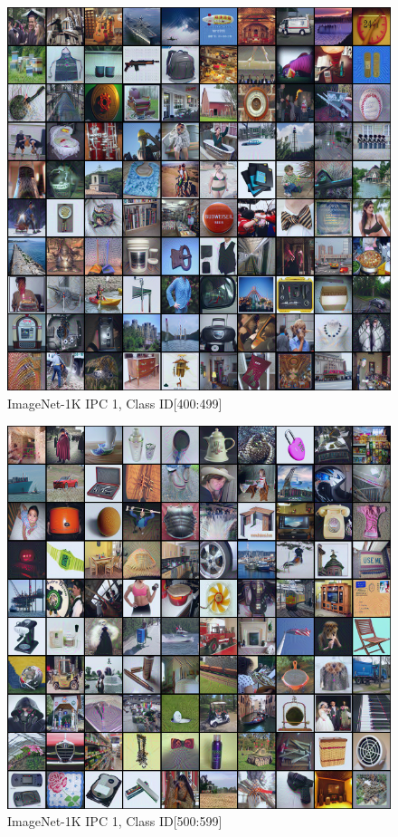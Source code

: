 \documentclass[10pt,twocolumn,letterpaper]{article}
\begin{document}
\begin{figure}
    \centering
    \includegraphics[width=\textwidth]{images/appendix/row-5-column-1.png}
    \caption{ImageNet-1K IPC 1, Class ID[400:499]}
\end{figure}
\begin{figure}
    \centering
    \includegraphics[width=\textwidth]{images/appendix/row-6-column-1.png}
    \caption{ImageNet-1K IPC 1, Class ID[500:599]}
\end{figure}
\end{document}
